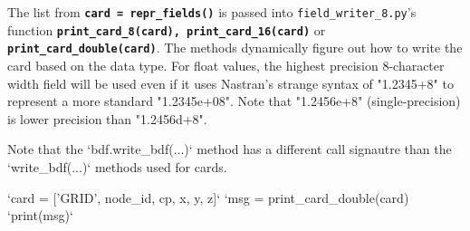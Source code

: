      The list from {\bf \tt card = repr_fields()} is passed into {\tt field_writer_8.py}'s function {\bf \tt print_card_8(card), print_card_16(card)} or {\bf \tt print_card_double(card)}.  The methods dynamically figure out how to write the card based on the data type.  For float values, the highest precision 8-character width field will be used even if it uses Nastran's strange syntax of "1.2345+8" to represent a more standard "1.2345e+08".  Note that "1.2456e+8" (single-precision) is lower precision than "1.2456d+8".

     Note that the `bdf.write_bdf(...)` method has a different call signautre than the `write_bdf(...)` methods used for cards.

     `card = ['GRID', node_id, cp, x, y, z]`
     `msg = print_card_double(card)
     `print(msg)`



